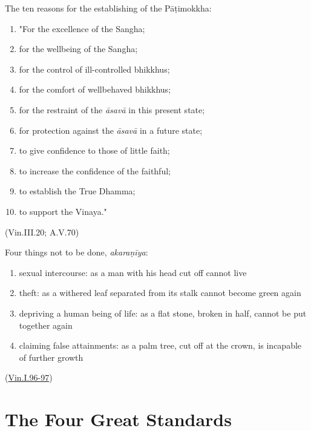 \begin{multicols}{2}

The ten reasons for the establishing of the Pāṭimokkha:

\begin{enumerate}
\def\labelenumi{\arabic{enumi}.}
\tightlist
\item
  "For the excellence of the Sangha;
\item
  for the wellbeing of the Sangha;
\item
  for the control of ill-controlled bhikkhus;
\item
  for the comfort of wellbehaved bhikkhus;
\item
  for the restraint of the \emph{āsavā} in this present state;
\item
  for protection against the \emph{āsavā} in a future state;
\item
  to give confidence to those of little faith;
\item
  to increase the confidence of the faithful;
\item
  to establish the True Dhamma;
\item
  to support the Vinaya."
\end{enumerate}

(Vin.III.20; A.V.70)

\columnbreak

Four things not to be done, \emph{akaraṇīya}:

\begin{enumerate}
\def\labelenumi{\arabic{enumi}.}
\tightlist
\item
  sexual intercourse: as a man with his head cut off cannot live
\item
  theft: as a withered leaf separated from its stalk cannot become green
  again
\item
  depriving a human being of life: as a flat stone, broken in half,
  cannot be put together again
\item
  claiming false attainments: as a palm tree, cut off at the crown, is
  incapable of further growth
\end{enumerate}

(\href{https://suttacentral.net/pli-tv-kd1/en/horner-brahmali}{Vin.I.96-97})

\end{multicols}
\par
\clearpage


\section{The Four Great Standards}

